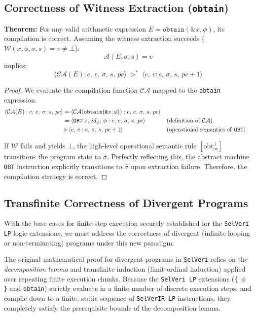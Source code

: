 \documentclass{article}
\begin{document}
\subsection{Correctness of Witness Extraction (\texttt{obtain})}

\textbf{Theorem:} For any valid arithmetic expression $E = \mathtt{obtain}(\texttt{\&}x, \phi)$, its compilation is correct. Assuming the witness extraction succeeds ($\mathcal{W}(x, \phi, \sigma, s) = v \neq \bot$):
\[
\mathcal{A}(E, \sigma, s) = v
\]
implies:
\[
\langle \mathcal{CA}(E) : c,\, e,\, \sigma,\, s,\, pc \rangle \; \triangleright^{\ast} \; \langle c,\, v : e,\, \sigma,\, s,\, pc + 1 \rangle
\]

\begin{proof}
We evaluate the compilation function $\mathcal{CA}$ mapped to the \texttt{obtain} expression.
\[
\begin{aligned}
\langle \mathcal{CA}(E) : c,\, e,\, \sigma,\, s,\, pc \rangle 
&= \langle \mathcal{CA}(\mathtt{obtain}(\texttt{\&}x, \phi)) : c,\, e,\, \sigma,\, s,\, pc \rangle \\
&= \langle \mathtt{OBT}\; x,\, id_\phi,\, \phi : c,\, e,\, \sigma,\, s,\, pc \rangle && \text{(definition of $\mathcal{CA}$)} \\
&\triangleright \langle c,\, v : e,\, \sigma,\, s,\, pc + 1 \rangle && \text{(operational semantics of \texttt{OBT})}
\end{aligned}
\]

If $\mathcal{W}$ fails and yields $\bot$, the high-level operational semantic rule $[\text{obt}^{\bot}_{\text{os}}]$ transitions the program state to $\hat{\sigma}$. Perfectly reflecting this, the abstract machine \texttt{OBT} instruction explicitly transitions to $\hat{\sigma}$ upon extraction failure. Therefore, the compilation strategy is correct.
\end{proof}

\subsection{Transfinite Correctness of Divergent Programs}

With the base cases for finite-step execution securely established for the \texttt{SelVeri LP} logic extensions, we must address the correctness of divergent (infinite looping or non-terminating) programs under this new paradigm. 

The original mathematical proof for divergent programs in \texttt{SelVeri} relies on the \textit{decomposition lemma} and transfinite induction (limit-ordinal induction) applied over repeating finite execution chunks. Because the \texttt{SelVeri LP} extensions (\texttt{\{ $\phi$ \}} and \texttt{obtain}) strictly evaluate in a finite number of discrete execution steps, and compile down to a finite, static sequence of \texttt{SelVerIR LP} instructions, they completely satisfy the prerequisite bounds of the decomposition lemma. 
\end{document}
